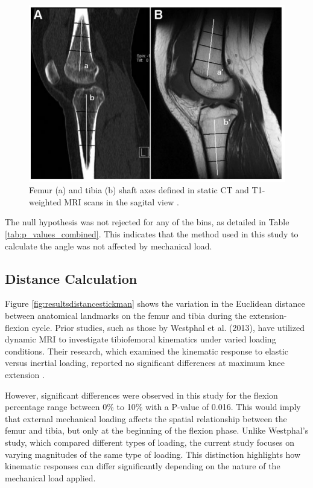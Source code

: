 \documentclass{micro-econ-thesis}
\begin{document}
\begin{figure}[H]
	\centering
	\includegraphics[width=0.7\linewidth]{dai_image}
	\caption{Femur (a) and tibia (b) shaft axes defined in static CT and T1-weighted MRI scans in the sagital view \parencite{dai_comparing_2021}. }
	\label{fig:daiimage}
\end{figure}

The null hypothesis was not rejected for any of the bins, as detailed in Table \ref{tab:p_values_combined}. This indicates that the method used in this study to calculate the angle was not affected by mechanical load.



\subsection{Distance Calculation}

Figure \ref{fig:resultsdistancestickman} shows the variation in the Euclidean distance between anatomical landmarks on the femur and tibia during the extension-flexion cycle. Prior studies, such as those by Westphal et al. (2013), have utilized dynamic MRI to investigate tibiofemoral kinematics under varied loading conditions. Their research, which examined the kinematic response to elastic versus inertial loading, reported no significant differences at maximum knee extension \parencite{westphal_load-dependent_2013}.

However, significant differences were observed in this study for the flexion percentage range between 0\% to 10\% with a P-value of 0.016. This would imply that external mechanical loading affects the spatial relationship between the femur and tibia, but only at the beginning of the flexion phase.  Unlike Westphal's study, which compared different types of loading, the current study focuses on varying magnitudes of the same type of loading. This distinction highlights how kinematic responses can differ significantly depending on the nature of the mechanical load applied.
\end{document}

